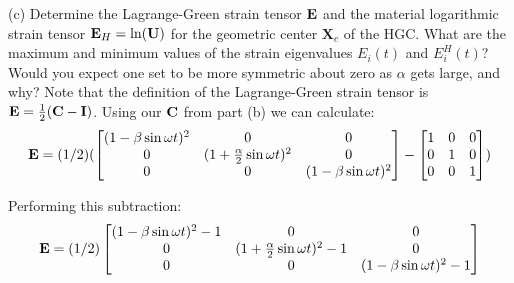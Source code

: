 \medskip
(c) Determine the Lagrange-Green strain tensor $\mathbf{E}$ and the material logarithmic strain tensor $\mathbf{E}_H = \ln (\mathbf{U})$ for the geometric center $\bm{X}_c$ of the HGC. 
What are the maximum and minimum values of the strain eigenvalues $E_i(t)$ and $E_i^H(t)$? 
Would you expect one set to be more symmetric about zero as $\alpha$ gets large, and why? \newline
Note that the definition of the  Lagrange-Green strain tensor is $\mathbf{E} = \frac{1}{2}(\mathbf{C} - \mathbf{I})$. Using our $\mathbf{C}$ from part (b) we can calculate:
\begin{equation}
\mathbf{E} = (1/2) (
\begin{bmatrix}
    (1 - \beta \sin{\omega t})^2 & 0 & 0 \\
    0 & (1 + \frac{\alpha}{2}\sin{\omega t})^2 & 0\\
    0 & 0 & (1 - \beta \sin{\omega t})^2
\end{bmatrix} -
\begin{bmatrix}
    1 & 0 & 0 \\
    0 & 1 & 0\\
    0 & 0 & 1
\end{bmatrix} )
\end{equation}

Performing this subtraction:
\begin{equation}
\mathbf{E} = (1/2)
\begin{bmatrix}
    (1 - \beta \sin{\omega t})^2 -1 & 0 & 0 \\
    0 & (1 + \frac{\alpha}{2}\sin{\omega t})^2 -1& 0\\
    0 & 0 & (1 - \beta \sin{\omega t})^2 -1
\end{bmatrix}
\end{equation}

